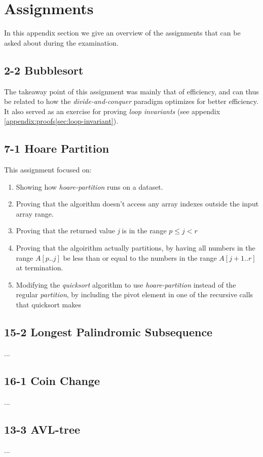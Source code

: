 
\thispagestyle{fancyplain}

\chapter{Assignments}
\label{appendix:assignments}
In this appendix section we give an overview of the assignments that can be
asked about during the examination.

\section{2-2 Bubblesort}
\label{appendix:assignments|ass:bubblesort}
The takeaway point of this assignment was mainly that of efficiency, and can
thus be related to how the \textit{divide-and-conquer} paradigm optimizes for
better efficiency. It also served as an exercise for proving \textit{loop
invariants} (see appendix \ref{appendix:proofs|sec:loop-invariant}).

\section{7-1 Hoare Partition}
\label{appendix:assignments|ass:hoare-partition}
This assignment focused on:
\begin{enumerate}
\item Showing how \textit{hoare-partition} runs on a dataset.
\item Proving that the algorithm doesn't access any array indexes outside the 
input array range.
\item Proving that the returned value \textit{j} is in the range $p\leq j < r$
\item Proving that the algoirithm actually partitions, by having all numbers in 
the range $A[p..j]$ be less than or equal to the numbers in the range $A[j+1..r]$ 
at termination.
\item Modifying the \textit{quicksort} algorithm to use \textit{hoare-partition} 
instead of the regular \textit{partition}, by including the pivot element in one 
of the recursive calls that quicksort makes
\end{enumerate}

\section{15-2 Longest Palindromic Subsequence}
\label{appendix:assignments|ass:longest-palindromic-subsequence}
...

\section{16-1 Coin Change}
\label{appendix:assignments|ass:coin-change}
...

\section{13-3 AVL-tree}
\label{appendix:assignments|ass:avl-tree}
...